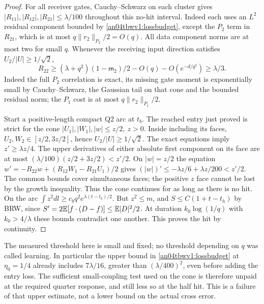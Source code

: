 \documentclass[11pt]{article}
\begin{document}
\begin{proof}
For all receiver gates, Cauchy--Schwarz on each cluster gives
$|R_{11}|,|R_{12}|,|R_{21}|\le\lambda/100$ throughout this
no-hit interval. Indeed each uses an $L^2$ residual component
bounded by \eqref{an04tbwv1:lossbudget}, except the $P_2$ term in
$R_{21}$, which is at most $q\|r_2\|_{P_2}/2=O(q)$.
All data component norms are at most two for small $q$. Whenever
the receiving input direction satisfies $U_2/|U|\ge1/\sqrt2$,
\[
 R_{22}\ge(\lambda+q^2)(1-\mathsf m_2)/2-O(q)
                    -O(e^{-d/q^2})\ge\lambda/3 .
\]
Indeed the full $P_2$ correlation is exact, its missing gate
moment is exponentially small by Cauchy--Schwarz, the Gaussian
tail on that cone and the bounded residual norm; the $P_1$ cost
is at most $q\|r_2\|_{P_1}/2$.

Start a positive-length compact Q2 arc at $t_b$. The reached entry
just proved is strict for the cone
$|U_1|,|W_1|,|w|\le z/2,\ z>0$.
Inside including its faces, $U_2,W_2\in[z/2,3z/2]$, hence
$U_2/|U|\ge1/\sqrt2$. The exact equations imply $z'\ge\lambda z/4$.
The upper derivatives of either absolute first component on its
face are at most $(\lambda/100)(z/2+3z/2)< z'/2$.
On $|w|=z/2$ the equation
$w'=-R_{22}w+(R_{12}W_1-R_{21}U_1)/2$ gives
$(|w|)'\le-\lambda z/6+\lambda z/200<z'/2$.
The common bounds cover simultaneous faces; the positive $z$ face
cannot be lost by the growth inequality. Thus the cone continues
for as long as there is no hit. On the arc
$\int z^2dl\ge c_b q^2 e^{\lambda(t-t_b)/2}$.
But $z^2\le m$, and $S\le C(1+t-t_h)$ by BRW, since
$S'=2\mathbb E[f\cdot(D-f)]\le\mathbb E|D|^2/2$. At duration
$k_0\log(1/q)$ with $k_0>4/\lambda$ these bounds contradict one
another. This proves the hit by continuity.
\end{proof}

The measured threshold here is small and fixed; no threshold
depending on $q$ was called learning. In particular the upper
bound in \eqref{an04tbwv1:lossbudget} at $\eta_0=1/4$
already includes $7\lambda/16$, greater than $(\lambda/400)^2$,
even before adding the entry loss. The sufficient small-coupling
test used on the cone is therefore unpaid at the required quarter
response, and still less so at the half hit. This is a failure of
that upper estimate, not a lower bound on the actual cross error.
\end{document}
